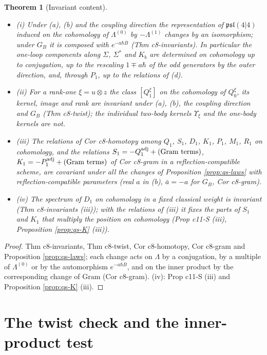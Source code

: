 \documentclass[11pt]{article}
\numberwithin{equation}{section}
\theoremstyle{plain}
\newtheorem{theorem}{Theorem}[section]
\theoremstyle{definition}
\begin{document}
\begin{theorem}[Invariant content]
\label{thm:qs-invariant}
\begin{itemize}
\item (i) Under (a), (b) and the coupling direction the representation of $\mathfrak{psl}(4|4)$ induced on the cohomology of $\Lambda^{(0)}$ by $-\Lambda^{(1)}$ changes by an isomorphism; under $G_B$ it is composed with $e^{-a\hbar B}$ (Thm c8-invariants). In particular the one-loop components along $\Sigma$, $\Sigma^*$ and $K_b$ are determined on cohomology up to conjugation, up to the rescaling $1\mp a\hbar$ of the odd generators by the outer direction, and, through $P_1$, up to the relations of (d).
\item (ii) For a rank-one $\xi=u\otimes z$ the class $[Q^\xi_1]$ on the cohomology of $Q^\xi_0$, its kernel, image and rank are invariant under (a), (b), the coupling direction and $G_B$ (Thm c8-twist); the individual two-body kernels $\Upsilon_\xi$ and the one-body kernels are not.
\item (iii) The relations of Cor c8-homotopy among $Q_1$, $S_1$, $D_1$, $K_1$, $P_1$, $M_1$, $R_1$ on cohomology, and the relations $S_1=-Q_1^{\rm adj}+(\text{Gram terms})$, $K_1=-P_1^{\rm adj}+(\text{Gram terms})$ of Cor c8-gram in a reflection-compatible scheme, are covariant under all the changes of Proposition \ref{prop:qs-laws} with reflection-compatible parameters (real $a$ in (b), $\bar a=-a$ for $G_B$, Cor c8-gram).
\item (iv) The spectrum of $D_1$ on cohomology in a fixed classical weight is invariant (Thm c8-invariants (iii)); with the relations of (iii) it fixes the parts of $S_1$ and $K_1$ that multiply the position on cohomology (Prop c11-S (iii), Proposition \ref{prop:qs-K} (iii)).
\end{itemize}
\end{theorem}

\begin{proof}
Thm c8-invariants, Thm c8-twist, Cor c8-homotopy, Cor c8-gram and Proposition \ref{prop:qs-laws}; each change acts on $\Lambda$ by a conjugation, by a multiple of $\Lambda^{(0)}$ or by the automorphism $e^{-a\hbar B}$, and on the inner product by the corresponding change of $\mathrm{Gram}$ (Cor c8-gram). (iv): Prop c11-S (iii) and Proposition \ref{prop:qs-K} (iii).
\end{proof}

\section{The twist check and the inner-product test}
\label{sec:qs-twist}
\end{document}
